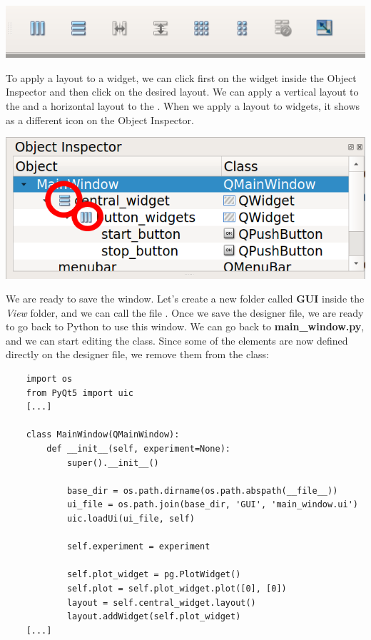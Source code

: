 \begin{center}
    \includegraphics[width=.4\textwidth]{images/Chapter_09/06_layouts.png}
\end{center}

To apply a layout to a widget, we can click first on the widget inside the Object Inspector and then click on the desired layout. We can apply a vertical layout to the  and a horizontal layout to the . When we apply a layout to widgets, it shows as a different icon on the Object Inspector.

\begin{center}
    \includegraphics[width=.4\textwidth]{images/Chapter_09/07_widgets_with_layouts.png}
\end{center}

We are ready to save the window. Let's create a new folder called \textbf{GUI} inside the \emph{View} folder, and we can call the file . Once we save the designer file, we are ready to go back to Python to use this window. We can go back to \textbf{main\_window.py}, and we can start editing the  class. Since some of the elements are now defined directly on the designer file, we remove them from the class:

\begin{verbatim}
    import os
    from PyQt5 import uic
    [...]

    class MainWindow(QMainWindow):
        def __init__(self, experiment=None):
            super().__init__()

            base_dir = os.path.dirname(os.path.abspath(__file__))
            ui_file = os.path.join(base_dir, 'GUI', 'main_window.ui')
            uic.loadUi(ui_file, self)

            self.experiment = experiment

            self.plot_widget = pg.PlotWidget()
            self.plot = self.plot_widget.plot([0], [0])
            layout = self.central_widget.layout()
            layout.addWidget(self.plot_widget)
    [...]
\end{verbatim}

